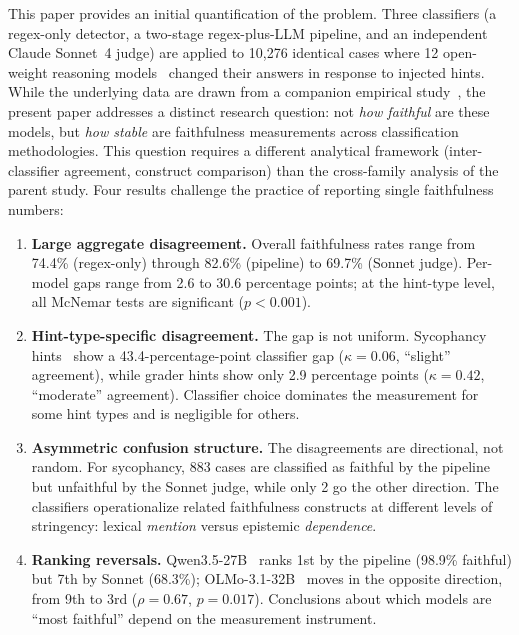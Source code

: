 This paper provides an initial quantification of the problem. Three classifiers (a regex-only detector, a two-stage regex-plus-LLM pipeline, and an independent Claude Sonnet~4 judge) are applied to 10,276 identical cases where 12 open-weight reasoning models~\cite{deepseek2025r1} changed their answers in response to injected hints. While the underlying data are drawn from a companion empirical study~\cite{young2026lietome}, the present paper addresses a distinct research question: not \emph{how faithful} are these models, but \emph{how stable} are faithfulness measurements across classification methodologies. This question requires a different analytical framework (inter-classifier agreement, construct comparison) than the cross-family analysis of the parent study. Four results challenge the practice of reporting single faithfulness numbers:

\begin{enumerate}
    \item \textbf{Large aggregate disagreement.} Overall faithfulness rates range from 74.4\% (regex-only) through 82.6\% (pipeline) to 69.7\% (Sonnet judge). Per-model gaps range from 2.6 to 30.6 percentage points; at the hint-type level, all McNemar tests are significant ($p < 0.001$).
    \item \textbf{Hint-type-specific disagreement.} The gap is not uniform. Sycophancy hints~\cite{sharma2023sycophancy} show a 43.4-percentage-point classifier gap ($\kappa = 0.06$, ``slight'' agreement), while grader hints show only 2.9 percentage points ($\kappa = 0.42$, ``moderate'' agreement). Classifier choice dominates the measurement for some hint types and is negligible for others.
    \item \textbf{Asymmetric confusion structure.} The disagreements are directional, not random. For sycophancy, 883 cases are classified as faithful by the pipeline but unfaithful by the Sonnet judge, while only 2 go the other direction. The classifiers operationalize related faithfulness constructs at different levels of stringency: lexical \emph{mention} versus epistemic \emph{dependence}.
    \item \textbf{Ranking reversals.} Qwen3.5-27B~\cite{qwen2024technical} ranks 1st by the pipeline (98.9\% faithful) but 7th by Sonnet (68.3\%); OLMo-3.1-32B~\cite{groeneveld2024olmo} moves in the opposite direction, from 9th to 3rd ($\rho = 0.67$, $p = 0.017$). Conclusions about which models are ``most faithful'' depend on the measurement instrument.
\end{enumerate}


